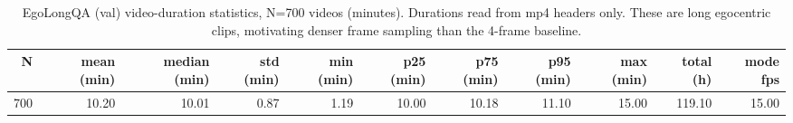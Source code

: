 \begin{table}[t]
\centering
\small
\caption{EgoLongQA (val) video-duration statistics, N=700 videos (minutes). Durations read from mp4 headers only. These are long egocentric clips, motivating denser frame sampling than the 4-frame baseline.}
\label{tab:durations}
\begin{tabular}{rrrrrrrrrrr}
\toprule
N & mean (min) & median (min) & std (min) & min (min) & p25 (min) & p75 (min) & p95 (min) & max (min) & total (h) & mode fps \\
\midrule
700 & 10.20 & 10.01 & 0.87 & 1.19 & 10.00 & 10.18 & 11.10 & 15.00 & 119.10 & 15.00 \\
\bottomrule
\end{tabular}
\end{table}
